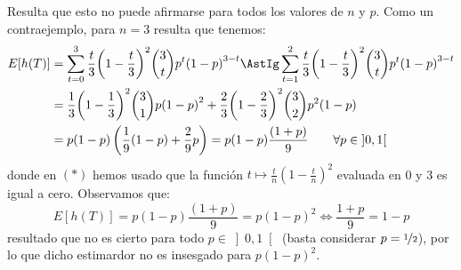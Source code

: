 \begin{ejercicio}
\begin{enumerate}[label=\alph*)]
            Resulta que esto no puede afirmarse para todos los valores de $n$ y $p$. Como un contraejemplo, para $n=3$ resulta que tenemos:
            \begin{align*}
                E[h(T)] &= \sum_{t=0}^{3}\frac{t}{3}{\left(1-\frac{t}{3}\right)}^{2}\binom{3}{t}p^t{(1-p)}^{3-t} \AstIg \sum_{t=1}^{2}\frac{t}{3}{\left(1-\frac{t}{3}\right)}^{2}\binom{3}{t}p^t{(1-p)}^{3-t} \\
                        &= \frac{1}{3}{\left(1-\frac{1}{3}\right)}^{2}\binom{3}{1}p{(1-p)}^{2}+\frac{2}{3}{\left(1-\dfrac{2}{3}\right)}^{2}\binom{3}{2}p^2(1-p) \\
                        &= p(1-p)\left(\frac{1}{9}(1-p)+\frac{2}{9}p\right) = p(1-p)\frac{(1+p)}{9} \qquad \forall p\in \left]0,1\right[
            \end{align*}
            donde en $(\ast)$ hemos usado que la función $t\mapsto \frac{t}{n}{\left(1-\frac{t}{n}\right)}^{2}$ evaluada en 0 y 3 es igual a cero. Observamos que:
            \begin{equation*}
                E[h(T)] = p(1-p)\frac{(1+p)}{9} = p{(1-p)}^{2} \Longleftrightarrow \dfrac{1+p}{9} = 1-p
            \end{equation*}
            resultado que no es cierto para todo $p\in \left]0,1\right[$ (basta considerar $p=\nicefrac{1}{2}$), por lo que dicho estimardor no es insesgado para $p{(1-p)}^{2}$.
    \end{enumerate}
\end{ejercicio}

